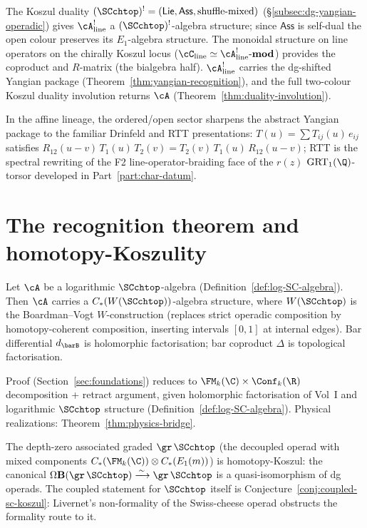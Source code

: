 The Koszul duality
$(\SCchtop)^! = (\mathsf{Lie}, \mathsf{Ass}, \text{shuffle-mixed})$
(\S\ref{subsec:dg-yangian-operadic}) gives
$\cA^!_{\mathrm{line}}$ a $(\SCchtop)^!$-algebra structure;
since $\mathsf{Ass}$ is self-dual the open colour preserves its
$E_1$-algebra structure. The monoidal structure on line
operators on the chirally Koszul locus
($\cC_{\mathrm{line}} \simeq \cA^!_{\mathrm{line}}\text{-}\mathbf{mod}$)
provides the coproduct and $R$-matrix (the bialgebra half).
$\cA^!_{\mathrm{line}}$ carries the dg-shifted Yangian package
(Theorem~\ref{thm:yangian-recognition}), and the full two-colour
Koszul duality involution returns $\cA$
(Theorem~\ref{thm:duality-involution}).

In the affine lineage, the ordered/open sector sharpens the
abstract Yangian package to the familiar Drinfeld and RTT
presentations: $T(u) = \sum T_{ij}(u)\, e_{ij}$ satisfies
$R_{12}(u-v)\, T_1(u)\, T_2(v) = T_2(v)\, T_1(u)\, R_{12}(u-v)$;
RTT is the spectral rewriting of the F2 line-operator-braiding face
of the $r(z)$ $\mathrm{GRT}_1(\Q)$-torsor developed in
Part~\ref{part:char-datum}.

\section*{The recognition theorem and homotopy-Koszulity}

\begin{maintheorem}
\label{thm:intro-recognition}
Let $\cA$ be a logarithmic $\SCchtop$-algebra
\textup{(}Definition~\textup{\ref{def:log-SC-algebra})}. Then
$\cA$ carries a $C_\ast(W(\SCchtop))$-algebra structure, where
$W(\SCchtop)$ is the Boardman--Vogt $W$-construction (replaces
strict operadic composition by homotopy-coherent composition,
inserting intervals $[0,1]$ at internal edges). Bar
differential $d_{\barB}$ is holomorphic factorisation; bar
coproduct $\Delta$ is topological factorisation.
\end{maintheorem}

Proof (Section~\ref{sec:foundations}) reduces to
$\FM_k(\C) \times \Conf_k(\R)$ decomposition + retract
argument, given holomorphic factorisation of Vol~I and
logarithmic $\SCchtop$ structure
(Definition~\ref{def:log-SC-algebra}). Physical realizations:
Theorem~\ref{thm:physics-bridge}.

\begin{maintheorem}
\label{thm:intro-homotopy-Koszul}
The depth-zero associated graded $\gr\,\SCchtop$ (the decoupled
operad with mixed components $C_\ast(\FM_k(\C))\otimes C_\ast(E_1(m))$)
is homotopy-Koszul: the canonical
$\Omega \mathbf{B}(\gr\,\SCchtop) \xrightarrow{\,\sim\,} \gr\,\SCchtop$ is
a quasi-isomorphism of dg operads. The coupled statement for
$\SCchtop$ itself is Conjecture~\ref{conj:coupled-sc-koszul}:
Livernet's non-formality of the Swiss-cheese operad \cite{Liv15}
obstructs the formality route to it.
\end{maintheorem}

